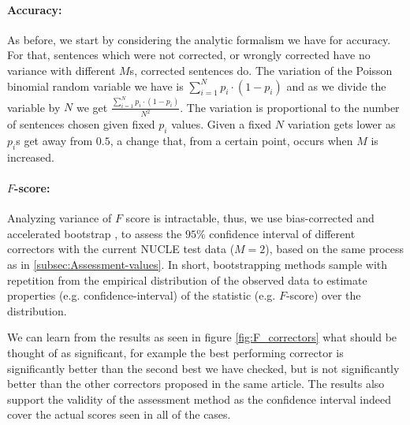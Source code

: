 		\begin{figure}
			\texttt{[image: \$F\_\{0.5]}$_Ms_significance}
			\caption{F Score results with different sizes of gold standard.\label{fig:F_Ms}}
		\end{figure}
		\begin{figure}
			\texttt{[image: \$F\_\{0.5]}$_significance}
			\caption{F Score results for different correctors including confidence interval.\label{fig:F_correctors}}
		\end{figure}
		
		
		\paragraph{Accuracy:} As before, we start by considering the analytic formalism we have for accuracy. For that, sentences which were not corrected, or wrongly corrected have no variance with different $M$s, corrected sentences do. The variation of the Poisson binomial random variable we have is $\sum_{i=1}^{N}p_i\cdot\left(1-p_i\right)$ and as we divide the variable by $N$ we get $\frac{\sum_{i=1}^{N}p_i\cdot\left(1-p_i\right)}{N^2}$. 
		The variation is proportional to the number of sentences chosen given fixed $p_i$ values. Given a fixed $N$ variation gets lower as $p_i$s get away from $0.5$, a change that, from a certain point, occurs when $M$ is increased.
		
		\paragraph{$F$-score:} Analyzing variance of $F$ score is intractable\cite{yeh2000more}, thus, we use bias-corrected and accelerated bootstrap \cite{efron1987better}, to assess the $95\%$ confidence interval of different correctors with the current NUCLE test data ($M=2$), based on the same process as in \ref{subsec:Assessment-values}. In short, bootstrapping methods sample with repetition from the empirical distribution of the observed data to estimate properties (e.g. confidence-interval) of the statistic (e.g. $F$-score) over the distribution. 
		
		We can learn from the results as seen in figure \ref{fig:F_correctors} what should be thought of as significant, for example the best performing corrector is significantly better than the second best we have checked, but is not significantly better than the other correctors proposed in the same article\cite{rozovskaya2016grammatical}. The results also  support the validity of the assessment method as the confidence interval indeed cover the actual scores seen in all of the cases. 
		
